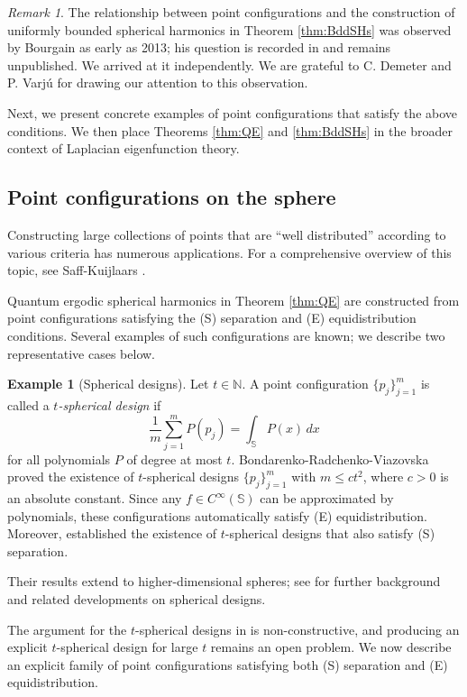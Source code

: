 \documentclass[12pt,reqno]{amsart}
\newcommand{\N}{\mathbb{N}}
\newcommand{\Sb}{\mathbb{S}}
\theoremstyle{plain}
\theoremstyle{definition}
\newtheorem*{ex}{Example}
\theoremstyle{remark}
\newtheorem*{rmk}{Remark}
\numberwithin{equation}{section}
\begin{document}
\begin{rmk}
The relationship between point configurations and the construction of uniformly bounded spherical harmonics in Theorem \ref{thm:BddSHs} was observed by Bourgain as early as 2013; his question is recorded in \cite[Page 957]{Bo3} and remains unpublished. We arrived at it independently. We are grateful to C. Demeter and P. Varj\'u for drawing our attention to this observation.
\end{rmk}

Next, we present concrete examples of point configurations that satisfy the above conditions. We then place Theorems \ref{thm:QE} and \ref{thm:BddSHs} in the broader context of Laplacian eigenfunction theory. 


\subsection{Point configurations on the sphere}\label{sec:pt}
Constructing large collections of points that are ``well distributed'' according to various criteria has numerous applications. For a comprehensive overview of this topic, see Saff-Kuijlaars \cite{SK}. 

Quantum ergodic spherical harmonics in Theorem \ref{thm:QE} are constructed from point configurations satisfying the (S) separation and (E) equidistribution conditions. Several examples of such configurations are known; we describe two representative cases below.

\begin{ex}[Spherical designs]
Let $t\in\N$. A point configuration $\{p_j\}_{j=1}^m$ is called a \textit{$t$-spherical design} if
$$\frac1m\sum_{j=1}^mP\left(p_j\right)=\int_\Sb P(x)\,dx$$
for all polynomials $P$ of degree at most $t$. Bondarenko-Radchenko-Viazovska \cite{BRV1} proved the existence of $t$-spherical designs $\{p_j\}_{j=1}^m$ with $m\le ct^2$, where $c>0$ is an absolute constant. Since any $f\in C^\infty(\Sb)$ can be approximated by polynomials, these configurations automatically satisfy (E) equidistribution. Moreover, \cite{BRV2} established the existence of $t$-spherical designs that also satisfy (S) separation.

Their results \cite{BRV1, BRV2} extend to higher-dimensional spheres; see \cite{BRV1, BRV2} for further background and related developments on spherical designs.
\end{ex}

The argument for the $t$-spherical designs in \cite{BRV1, BRV2} is non-constructive, and producing an explicit $t$-spherical design for large $t$ remains an open problem. We now describe an explicit family of point configurations satisfying both (S) separation and (E) equidistribution.
\end{document}
